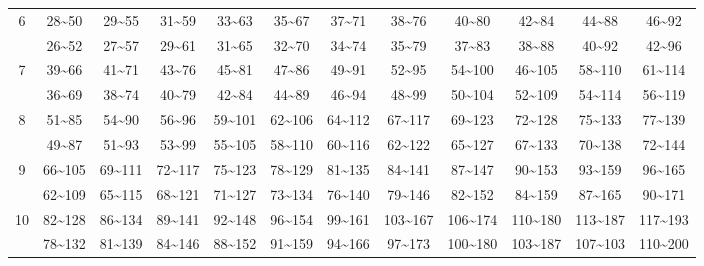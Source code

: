 \documentclass[lang=cn,10pt]{elegantbook}
\begin{document}
\begin{longtable}{c|ccccccccccc}
    6 & 28\textasciitilde50 & 29\textasciitilde55 & 31\textasciitilde59 & 33\textasciitilde63 & 35\textasciitilde67 & 37\textasciitilde71 & 38\textasciitilde76 & 40\textasciitilde80 & 42\textasciitilde84 & 44\textasciitilde88 & 46\textasciitilde92 \\
      & 26\textasciitilde52 & 27\textasciitilde57 & 29\textasciitilde61 & 31\textasciitilde65 & 32\textasciitilde70 & 34\textasciitilde74 & 35\textasciitilde79 & 37\textasciitilde83 & 38\textasciitilde88 & 40\textasciitilde92 & 42\textasciitilde96 \\
    7 & 39\textasciitilde66 & 41\textasciitilde71 & 43\textasciitilde76 & 45\textasciitilde81 & 47\textasciitilde86 & 49\textasciitilde91 & 52\textasciitilde95 & 54\textasciitilde100 & 46\textasciitilde105 & 58\textasciitilde110 & 61\textasciitilde114 \\
      & 36\textasciitilde69 & 38\textasciitilde74 & 40\textasciitilde79 & 42\textasciitilde84 & 44\textasciitilde89 & 46\textasciitilde94 & 48\textasciitilde99 & 50\textasciitilde104 & 52\textasciitilde109 & 54\textasciitilde114 & 56\textasciitilde119 \\
    8 & 51\textasciitilde85 & 54\textasciitilde90 & 56\textasciitilde96 & 59\textasciitilde101 & 62\textasciitilde106 & 64\textasciitilde112 & 67\textasciitilde117 & 69\textasciitilde123 & 72\textasciitilde128 & 75\textasciitilde133 & 77\textasciitilde139 \\
      & 49\textasciitilde87 & 51\textasciitilde93 & 53\textasciitilde99 & 55\textasciitilde105 & 58\textasciitilde110 & 60\textasciitilde116 & 62\textasciitilde122 & 65\textasciitilde127 & 67\textasciitilde133 & 70\textasciitilde138 & 72\textasciitilde144 \\
    9 & 66\textasciitilde105 & 69\textasciitilde111 & 72\textasciitilde117 & 75\textasciitilde123 & 78\textasciitilde129 & 81\textasciitilde135 & 84\textasciitilde141 & 87\textasciitilde147 & 90\textasciitilde153 & 93\textasciitilde159 & 96\textasciitilde165 \\
      & 62\textasciitilde109 & 65\textasciitilde115 & 68\textasciitilde121 & 71\textasciitilde127 & 73\textasciitilde134 & 76\textasciitilde140 & 79\textasciitilde146 & 82\textasciitilde152 & 84\textasciitilde159 & 87\textasciitilde165 & 90\textasciitilde171 \\
    10 & 82\textasciitilde128 & 86\textasciitilde134 & 89\textasciitilde141 & 92\textasciitilde148 & 96\textasciitilde154 & 99\textasciitilde161 & 103\textasciitilde167 & 106\textasciitilde174 & 110\textasciitilde180 & 113\textasciitilde187 & 117\textasciitilde193 \\
       & 78\textasciitilde132 & 81\textasciitilde139 & 84\textasciitilde146 & 88\textasciitilde152 & 91\textasciitilde159 & 94\textasciitilde166 & 97\textasciitilde173 & 100\textasciitilde180 & 103\textasciitilde187 & 107\textasciitilde103 & 110\textasciitilde200 \\
    \hline
\end{longtable}
\normalsize
\end{document}

